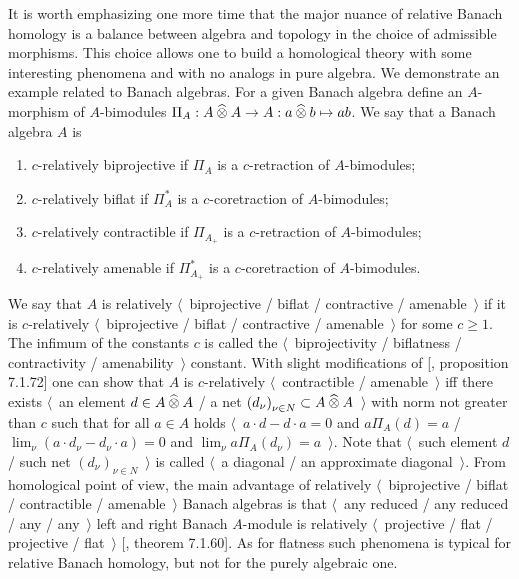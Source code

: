 It is worth emphasizing one more time that the major nuance of relative Banach
homology is a balance between algebra and topology in the choice of
admissible morphisms. This choice allows one to build a homological theory with
some interesting phenomena and with no analogs in pure algebra. We demonstrate an
example related to Banach algebras. For a given Banach algebra define an $A$-morphism 
of $A$-bimodules $\Pi_A:A\mathbin{\widehat{\otimes}} A\to A:a\mathbin{\widehat{\otimes}} b\mapsto ab$. We say 
that a Banach algebra $A$ is 
\begin{enumerate}[label = (\roman*)]
  \item $c$-relatively biprojective if $\Pi_A$ is a $c$-retraction of
  $A$-bimodules;

  \item $c$-relatively biflat if $\Pi_A^*$ is a $c$-coretraction of 
  $A$-bimodules;

  \item $c$-relatively contractible if $\Pi_{A_+}$ is a $c$-retraction of
  $A$-bimodules;

  \item $c$-relatively amenable if $\Pi_{A_+}^*$ is a $c$-coretraction of
  $A$-bimodules.
\end{enumerate}

We say that $A$ is relatively $\langle$~biprojective / biflat / contractive /
amenable~$\rangle$ if it is $c$-relatively $\langle$~biprojective / biflat /
contractive / amenable~$\rangle$ for some $c\geq 1$. The infimum of the
constants $c$ is called the $\langle$~biprojectivity / biflatness /
contractivity / amenability~$\rangle$ constant.  With slight modifications of
[\cite{HelBanLocConvAlg}, proposition 7.1.72] one can show that $A$ is
$c$-relatively $\langle$~contractible / amenable~$\rangle$ iff there exists
$\langle$~an element $d\in A\mathbin{\widehat{\otimes}} A$ / a net 
${(d_\nu)}_{\nu\in N}\subset A\mathbin{\widehat{\otimes}} A$~$\rangle$ with 
norm not greater than $c$ such that for all $a\in A$ holds 
$\langle$~$a\cdot d-d\cdot a=0$ and $a\Pi_A(d)=a$ / 
$\lim_\nu(a\cdot d_\nu-d_\nu\cdot a)=0$ 
and $\lim_\nu a\Pi_A(d_\nu)=a$~$\rangle$. Note that 
$\langle$~such element $d$ / such net ${(d_\nu)}_{\nu\in N}$~$\rangle$ is called
$\langle$~a diagonal / an approximate diagonal~$\rangle$. From homological point
of view, the main advantage of relatively $\langle$~biprojective / biflat /
contractible / amenable~$\rangle$ Banach algebras is that $\langle$~any reduced
/ any reduced / any / any~$\rangle$ left and right Banach $A$-module is
relatively $\langle$~projective / flat / projective / flat~$\rangle$
[\cite{HelBanLocConvAlg}, theorem 7.1.60]. As for flatness such phenomena is
typical for relative Banach homology, but not for the purely algebraic one.
